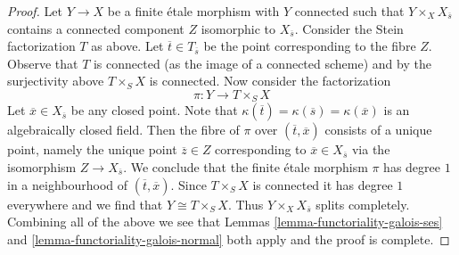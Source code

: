 \begin{proof}
\medskip\noindent
Let $Y \to X$ be a finite \'etale morphism with $Y$ connected such that
$Y \times_X X_{\overline{s}}$ contains a connected component $Z$
isomorphic to $X_{\overline{s}}$. Consider the Stein factorization $T$
as above. Let $\overline{t} \in T_{\overline{s}}$ be the point corresponding
to the fibre $Z$. Observe that $T$ is connected (as the image of a connected
scheme) and by the surjectivity above $T \times_S X$ is connected.
Now consider the factorization
$$
\pi : Y \longrightarrow T \times_S X
$$
Let $\overline{x} \in X_{\overline{s}}$ be any closed point. Note that
$\kappa(\overline{t}) = \kappa(\overline{s}) = \kappa(\overline{x})$
is an algebraically closed field.
Then the fibre of $\pi$ over $(\overline{t}, \overline{x})$ consists
of a unique point, namely the unique point $\overline{z} \in Z$
corresponding to $\overline{x} \in X_{\overline{s}}$ via the
isomorphism $Z \to X_{\overline{s}}$. We conclude that the finite
\'etale morphism $\pi$ has degree $1$ in a neighbourhood of
$(\overline{t}, \overline{x})$. Since $T \times_S X$ is connected
it has degree $1$ everywhere and we find that $Y \cong T \times_S X$.
Thus $Y \times_X X_{\overline{s}}$ splits completely.
Combining all of the above we see that
Lemmas \ref{lemma-functoriality-galois-ses} and
\ref{lemma-functoriality-galois-normal}
both apply and the proof is complete.
\end{proof}